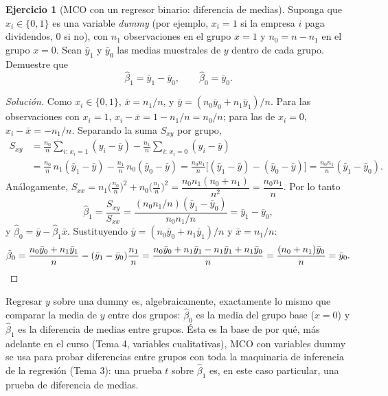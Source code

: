 \documentclass[11pt,a4paper,oneside]{article}
\theoremstyle{plain}
\theoremstyle{definition}
\newtheorem{exercise}[teorema]{Ejercicio}
\begin{document}
\begin{exercise}[MCO con un regresor binario: diferencia de medias]\label{ej:dummy}
Suponga que $x_i\in\{0,1\}$ es una variable \emph{dummy} (por ejemplo,
$x_i=1$ si la empresa $i$ paga dividendos, $0$ si no), con $n_1$
observaciones en el grupo $x=1$ y $n_0=n-n_1$ en el grupo $x=0$. Sean
$\bar y_1$ y $\bar y_0$ las medias muestrales de $y$ dentro de cada
grupo. Demuestre que
\[
  \hat\beta_1 = \bar y_1 - \bar y_0, \qquad \hat\beta_0 = \bar y_0 .
\]
\end{exercise}
\begin{proof}[Solución]
Como $x_i\in\{0,1\}$, $\bar x=n_1/n$, y
$\bar y = (n_0\bar y_0+n_1\bar y_1)/n$. Para las observaciones con
$x_i=1$, $x_i-\bar x = 1-n_1/n=n_0/n$; para las de $x_i=0$,
$x_i-\bar x=-n_1/n$. Separando la suma $S_{xy}$ por grupo,
\begin{align*}
  S_{xy} &= \frac{n_0}{n}\sum_{i:\,x_i=1}(y_i-\bar y)
          - \frac{n_1}{n}\sum_{i:\,x_i=0}(y_i-\bar y) \\
  &= \frac{n_0}{n}\,n_1(\bar y_1-\bar y) - \frac{n_1}{n}\,n_0(\bar y_0-\bar y)
   = \frac{n_0n_1}{n}\big[(\bar y_1-\bar y)-(\bar y_0-\bar y)\big]
   = \frac{n_0n_1}{n}(\bar y_1-\bar y_0).
\end{align*}
Análogamente,
$S_{xx} = n_1\big(\tfrac{n_0}{n}\big)^2+n_0\big(\tfrac{n_1}{n}\big)^2
= \dfrac{n_0n_1(n_0+n_1)}{n^2} = \dfrac{n_0n_1}{n}$. Por lo tanto
\[
  \hat\beta_1 = \frac{S_{xy}}{S_{xx}}
  = \frac{(n_0n_1/n)(\bar y_1-\bar y_0)}{n_0n_1/n} = \bar y_1-\bar y_0,
\]
y $\hat\beta_0=\bar y-\hat\beta_1\bar x$. Sustituyendo
$\bar y=(n_0\bar y_0+n_1\bar y_1)/n$ y $\bar x=n_1/n$:
\[
  \hat\beta_0 = \frac{n_0\bar y_0+n_1\bar y_1}{n}
  - (\bar y_1-\bar y_0)\frac{n_1}{n}
  = \frac{n_0\bar y_0+n_1\bar y_1 - n_1\bar y_1+n_1\bar y_0}{n}
  = \frac{(n_0+n_1)\bar y_0}{n} = \bar y_0 . \qedhere
\]
\end{proof}

\begin{summaryBox}
Regresar $y$ sobre una dummy es, algebraicamente, exactamente lo mismo
que comparar la media de $y$ entre dos grupos: $\hat\beta_0$ es la media
del grupo base ($x=0$) y $\hat\beta_1$ es la diferencia de medias entre
grupos. Ésta es la base de por qué, más adelante en el curso (Tema 4,
variables cualitativas), MCO con variables dummy se usa para probar
diferencias entre grupos con toda la maquinaria de inferencia de la
regresión (Tema 3): una prueba $t$ sobre $\hat\beta_1$ es, en este caso
particular, una prueba de diferencia de medias.
\end{summaryBox}
\end{document}
